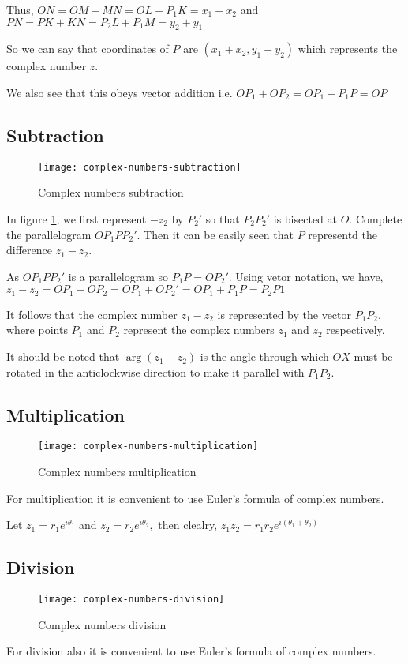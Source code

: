 Thus, $ON = OM + MN = OL + P_1K = x_1 + x_2$ and $PN = PK + KN = P_2L + P_1M = y_2 + y_1$

So we can say that coordinates of $P$ are $(x_1 + x_2, y_1 + y_2)$ which represents the complex number $z.$

We also see that this obeys vector addition i.e. $OP_1 + OP_2 = OP_1 + P_1P = OP$

\subsection{Subtraction}
\begin{figure}[h]
  \begin{center}
    \texttt{[image: complex-numbers-subtraction]}
    \caption{Complex numbers subtraction}
    \label{fig:cns}
  \end{center}
\end{figure}
In figure \ref{fig:cns}, we first represent $-z_2$ by $P_2'$ so that  $P_2P_2'$ is bisected at $O.$ Complete the parallelogram $OP_1PP_2'.$ Then it can be
easily seen that $P$  representd the difference $z_1 - z_2.$

As $OP_1PP_2'$ is a parallelogram so $P_1P = OP_2'.$ Using vetor notation, we have, $z_1 - z_2 = OP_1 - OP_2 = OP_1 + OP_2' = OP_1 + P_1P = P_2P1$

It follows that the complex number $z_1 - z_2$ is represented by the vector $P_1P_2,$ where points $P_1$ and $P_2$ represent the
complex numbers $z_1$ and $z_2$ respectively.

It should be noted that $\arg(z_1 - z_2)$ is the angle through which $OX$ must be rotated in the anticlockwise direction to make it
parallel with $P_1P_2.$

\subsection{Multiplication}
\begin{figure}[H]
  \begin{center}
    \texttt{[image: complex-numbers-multiplication]}
    \caption{Complex numbers multiplication}
  \end{center}
\end{figure}
For multiplication it is convenient to use Euler's formula of complex numbers.

Let $z_1 = r_1e^{i\theta_1}$ and $z_2 = r_2e^{i\theta_2},$ then clealry, $z_1z_2 = r_1r_2e^{i(\theta_1 + \theta_2)}$

\subsection{Division}
\begin{figure}[!h]
  \begin{center}
    \texttt{[image: complex-numbers-division]}
    \caption{Complex numbers division}
  \end{center}
\end{figure}
For division also it is convenient to use Euler's formula of complex numbers.\\

